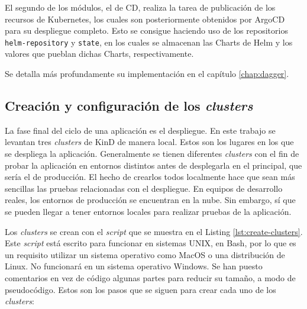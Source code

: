 El segundo de los módulos, el de CD, realiza la tarea de publicación de los recursos de Kubernetes, los cuales son posteriormente obtenidos por ArgoCD para su despliegue completo. Esto se consigue haciendo uso de los repositorios \texttt{helm-repository} y \texttt{state}, en los cuales se almacenan las Charts de Helm y los valores que pueblan dichas Charts, respectivamente.

Se detalla más profundamente su implementación en el capítulo \ref{chap:dagger}.

\subsection*{Creación y configuración de los \textit{clusters}}
\label{subsec:clusters}

La fase final del ciclo de una aplicación es el despliegue. En este trabajo se levantan tres \textit{clusters} de KinD de manera local. Estos son los lugares en los que se despliega la aplicación. Generalmente se tienen diferentes \textit{clusters} con el fin de probar la aplicación en entornos distintos antes de desplegarla en el principal, que sería el de producción. El hecho de crearlos todos localmente hace que sean más sencillas las pruebas relacionadas con el despliegue. En equipos de desarrollo reales, los entornos de producción se encuentran en la nube. Sin embargo, sí que se pueden llegar a tener entornos locales para realizar pruebas de la aplicación.

Los \textit{clusters} se crean con el \textit{script} que se muestra en el Listing \ref{lst:create-clusters}. Este \textit{script} está escrito para funcionar en sistemas UNIX, en Bash, por lo que es un requisito utilizar un sistema operativo como MacOS o una distribución de Linux. No funcionará en un sistema operativo Windows. Se han puesto comentarios en vez de código algunas partes para reducir su tamaño, a modo de pseudocódigo. Estos son los pasos que se siguen para crear cada uno de los \textit{clusters}:

